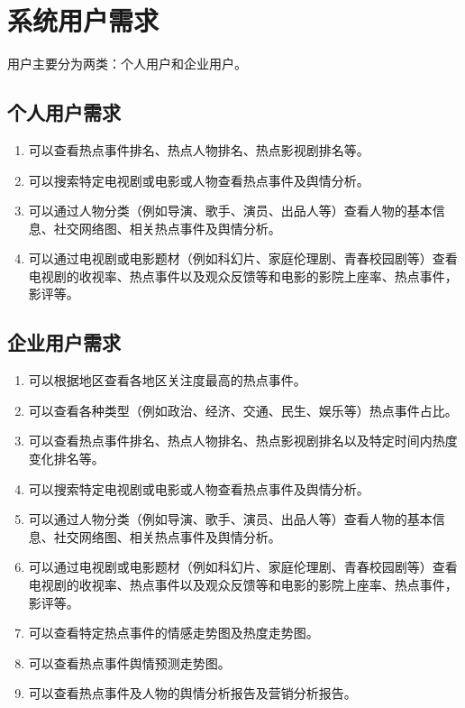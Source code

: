 \section{系统用户需求}
用户主要分为两类：个人用户和企业用户。
\subsection{个人用户需求}
\begin{enumerate}
\item	可以查看热点事件排名、热点人物排名、热点影视剧排名等。
\item	可以搜索特定电视剧或电影或人物查看热点事件及舆情分析。
\item	可以通过人物分类（例如导演、歌手、演员、出品人等）查看人物的基本信息、社交网络图、相关热点事件及舆情分析。
\item	可以通过电视剧或电影题材（例如科幻片、家庭伦理剧、青春校园剧等）查看电视剧的收视率、热点事件以及观众反馈等和电影的影院上座率、热点事件，影评等。\end{enumerate}

\subsection{企业用户需求}
\begin{enumerate}
\item	可以根据地区查看各地区关注度最高的热点事件。
\item	可以查看各种类型（例如政治、经济、交通、民生、娱乐等）热点事件占比。
\item	可以查看热点事件排名、热点人物排名、热点影视剧排名以及特定时间内热度变化排名等。
\item	可以搜索特定电视剧或电影或人物查看热点事件及舆情分析。
\item	可以通过人物分类（例如导演、歌手、演员、出品人等）查看人物的基本信息、社交网络图、相关热点事件及舆情分析。
\item	可以通过电视剧或电影题材（例如科幻片、家庭伦理剧、青春校园剧等）查看电视剧的收视率、热点事件以及观众反馈等和电影的影院上座率、热点事件，影评等。
\item	可以查看特定热点事件的情感走势图及热度走势图。
\item	可以查看热点事件舆情预测走势图。
\item	可以查看热点事件及人物的舆情分析报告及营销分析报告。
\end{enumerate}